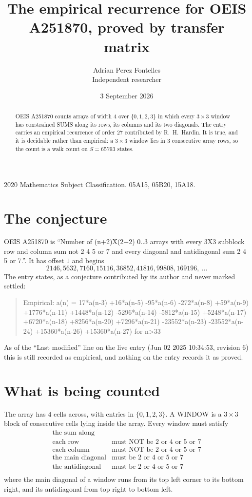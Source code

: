 \documentclass[11pt,a4paper]{article}
\title{The empirical recurrence for OEIS A251870, proved by transfer matrix}
\author{Adrian Perez Fontelles\\ \small Independent researcher}
\date{3 September 2026}
\theoremstyle{plain}
\theoremstyle{definition}
\begin{document}
\maketitle

\begin{abstract}
OEIS A251870 counts arrays of width $4$ over $\{0,1,2,3\}$ in which every $3\times3$ window has
constrained SUMS along its rows, its columns and its two diagonals. The entry carries an
empirical recurrence of order $27$ contributed by R.~H.~Hardin. It is true, and it is
decidable rather than empirical: a $3\times3$ window lies in $3$ consecutive array rows,
so the count is a walk count on $S=65793$ states.
\end{abstract}

\noindent\small 2020 Mathematics Subject Classification. 05A15, 05B20, 15A18.\normalsize

\section{The conjecture}

OEIS A251870 is ``Number of (n+2)X(2+2) 0..3 arrays with every 3X3 subblock row and column sum not 2 4 5 or 7 and every diagonal and antidiagonal sum 2 4 5 or 7.''. It has offset $1$ and begins
\[
2146, 5632, 7160, 15116, 36852, 41816, 99808, 169196,\ \dots
\]
The entry states, as a conjecture contributed by its author and never marked settled:
\begin{quote}
Empirical: a(n) = 17*a(n-3) +16*a(n-5) -95*a(n-6) -272*a(n-8) +59*a(n-9) +1776*a(n-11) +1448*a(n-12) -5296*a(n-14) -5812*a(n-15) +5248*a(n-17) +6720*a(n-18) +8256*a(n-20) +7296*a(n-21) -23552*a(n-23) -23552*a(n-24) +15360*a(n-26) +15360*a(n-27) for n>33
\end{quote}
As of the ``Last modified'' line on the live entry (Jun 02 2025 10:34:53, revision 6) this is still
recorded as empirical, and nothing on the entry records it as proved.

\section{What is being counted}

The array has $4$ cells across, with entries in $\{0,1,2,3\}$. A WINDOW is a $3\times3$ block
of consecutive cells lying inside the array. Every window must satisfy
\[
\begin{array}{ll}
\text{the sum along} & \text{} \\[2pt]
\text{each row} & \text{must NOT be 2 or 4 or 5 or 7} \\
\text{each column} & \text{must NOT be 2 or 4 or 5 or 7} \\
\text{the main diagonal} & \text{must be 2 or 4 or 5 or 7} \\
\text{the antidiagonal} & \text{must be 2 or 4 or 5 or 7} \\
\end{array}
\]
where the main diagonal of a window runs from its top left corner to its bottom right, and its
antidiagonal from top right to bottom left.
\end{document}
